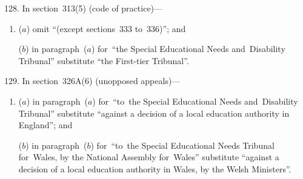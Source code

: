\documentclass[12pt,a4paper]{article}
\begin{document}
\medskip

128.  In section~313(5) (code of practice)—
\begin{enumerate}\item[]
($a$) omit “(except sections~333 to~336)”; and

($b$) in paragraph~($a$)  for~“the Special Educational Needs and~Disability Tribunal” substitute “the First-tier Tribunal”.
\end{enumerate}

\medskip

129.  In section~326A(6) (unopposed appeals)—
\begin{enumerate}\item[]
($a$) in paragraph~($a$)  for~“to~the Special Educational Needs and~Disability Tribunal” substitute “against a decision of a local education authority in England”; and

($b$) in paragraph~($b$)  for~“to~the Special Educational Needs Tribunal for~Wales, by the National Assembly for~Wales” substitute “against a decision of a local education authority in Wales, by the Welsh Ministers”.
\end{enumerate}

\medskip
\end{document}
